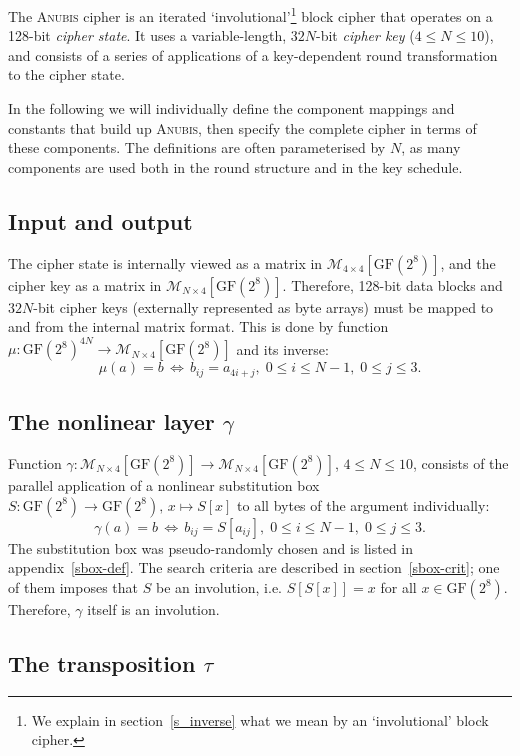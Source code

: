 \documentclass{llncs}
\newcommand{\GF}{\mathrm{GF}}
\newcommand{\matrices}[2]{\mathcal{M}_{#1 \times #2}[\GF(2^8)]}
\begin{document}
The \textsc{Anubis} cipher is an iterated
`involutional'\footnote{We explain in section~\ref{s_inverse} what we mean by
an `involutional' block cipher.}
block
cipher that operates on a 128-bit \emph{cipher state}. It uses a
variable-length, $32N$-bit \emph{cipher key} ($4 \leqslant N
\leqslant 10$), and consists of a series of applications of a
key-dependent round transformation to the cipher state.

In the following we will individually define the component
mappings and constants that build up \textsc{Anubis}, then specify
the complete cipher in terms of these components. The definitions
are often parameterised by $N$, as many components are used both
in the round structure and in the key schedule.

\subsection{Input and output}

The cipher state is internally viewed as a matrix in
$\matrices{4}{4}$, and the cipher key as a matrix in
$\matrices{N}{4}$. Therefore, 128-bit data blocks and $32N$-bit
cipher keys (externally represented as byte arrays) must be mapped
to and from the internal matrix format. This is done by function
$\mu: \GF(2^8)^{4N} \rightarrow \matrices{N}{4}$ and its inverse:
\[
\mu(a) = b \,\Leftrightarrow\, b_{ij} = a_{4i + j}, \; 0
\leqslant i \leqslant N-1, \; 0 \leqslant j \leqslant 3.
\]

\subsection{The nonlinear layer $\gamma$}

Function $\gamma: \matrices{N}{4} \rightarrow \matrices{N}{4}$,
$4 \leqslant N \leqslant 10$, consists of the parallel application
of a nonlinear substitution box $S: \GF(2^8) \rightarrow
\GF(2^8), \, x \mapsto S[x]$ to all bytes of the argument
individually:
\[
\gamma(a) = b \,\Leftrightarrow\, b_{ij} = S[a_{ij}], \; 0
\leqslant i \leqslant N-1, \; 0 \leqslant j \leqslant 3.
\]
The substitution box was pseudo-randomly chosen and is listed in
appendix~\ref{sbox-def}. The search criteria are described in
section~\ref{sbox-crit}; one of them imposes that $S$ be an
involution, i.e. $S[S[x]] = x$ for all $x \in \GF(2^8)$.
Therefore, $\gamma$ itself is an involution.

\subsection{The transposition $\tau$}
\end{document}

